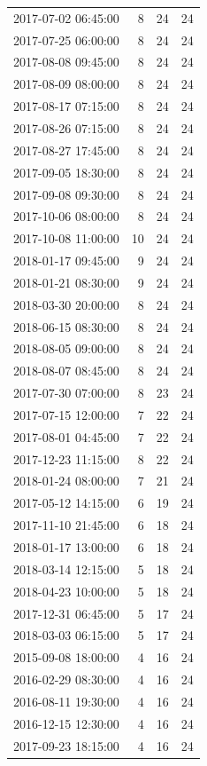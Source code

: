 \begin{tabular}{lrrr}
2017-07-02 06:45:00 & 8 & 24 & 24 \\
2017-07-25 06:00:00 & 8 & 24 & 24 \\
2017-08-08 09:45:00 & 8 & 24 & 24 \\
2017-08-09 08:00:00 & 8 & 24 & 24 \\
2017-08-17 07:15:00 & 8 & 24 & 24 \\
2017-08-26 07:15:00 & 8 & 24 & 24 \\
2017-08-27 17:45:00 & 8 & 24 & 24 \\
2017-09-05 18:30:00 & 8 & 24 & 24 \\
2017-09-08 09:30:00 & 8 & 24 & 24 \\
2017-10-06 08:00:00 & 8 & 24 & 24 \\
2017-10-08 11:00:00 & 10 & 24 & 24 \\
2018-01-17 09:45:00 & 9 & 24 & 24 \\
2018-01-21 08:30:00 & 9 & 24 & 24 \\
2018-03-30 20:00:00 & 8 & 24 & 24 \\
2018-06-15 08:30:00 & 8 & 24 & 24 \\
2018-08-05 09:00:00 & 8 & 24 & 24 \\
2018-08-07 08:45:00 & 8 & 24 & 24 \\
2017-07-30 07:00:00 & 8 & 23 & 24 \\
2017-07-15 12:00:00 & 7 & 22 & 24 \\
2017-08-01 04:45:00 & 7 & 22 & 24 \\
2017-12-23 11:15:00 & 8 & 22 & 24 \\
2018-01-24 08:00:00 & 7 & 21 & 24 \\
2017-05-12 14:15:00 & 6 & 19 & 24 \\
2017-11-10 21:45:00 & 6 & 18 & 24 \\
2018-01-17 13:00:00 & 6 & 18 & 24 \\
2018-03-14 12:15:00 & 5 & 18 & 24 \\
2018-04-23 10:00:00 & 5 & 18 & 24 \\
2017-12-31 06:45:00 & 5 & 17 & 24 \\
2018-03-03 06:15:00 & 5 & 17 & 24 \\
2015-09-08 18:00:00 & 4 & 16 & 24 \\
2016-02-29 08:30:00 & 4 & 16 & 24 \\
2016-08-11 19:30:00 & 4 & 16 & 24 \\
2016-12-15 12:30:00 & 4 & 16 & 24 \\
2017-09-23 18:15:00 & 4 & 16 & 24 \\

\end{tabular}
